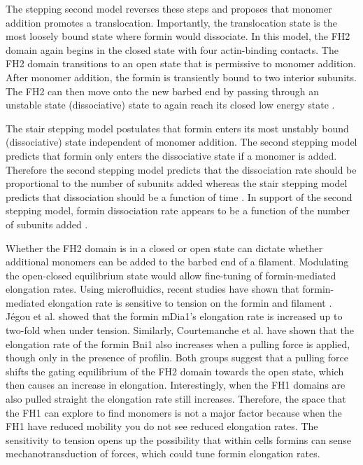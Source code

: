 The stepping second model reverses these steps and proposes that monomer addition promotes a translocation. Importantly, the translocation state is the most loosely bound state where formin would dissociate. In this model, the FH2 domain again begins in the closed state with four actin-binding contacts. The FH2 domain transitions to an open state that is permissive to monomer addition. After monomer addition, the formin is transiently bound to two interior subunits. The FH2 can then move onto the new barbed end by passing through an unstable state (dissociative) state to again reach its closed low energy state \citep{paul_role_2008}.

The stair stepping model postulates that formin enters its most unstably bound (dissociative) state independent of monomer addition. The second stepping model predicts that formin only enters the dissociative state if a monomer is added. Therefore the second stepping model predicts that the dissociation rate should be proportional to the number of subunits added whereas the stair stepping model predicts that dissociation should be a function of time \citep{paul_review_2009}. In support of the second stepping model, formin dissociation rate appears to be a function of the number of subunits added \citep{paul_role_2008}. 

Whether the FH2 domain is in a closed or open state can dictate whether additional monomers can be added to the barbed end of a filament. Modulating the open-closed equilibrium state would allow fine-tuning of formin-mediated elongation rates. Using microfluidics, recent studies have shown that formin-mediated elongation rate is sensitive to tension on the formin and filament \citep{courtemanche_tension_2013,jegou_formin_2013}. Jégou et al. showed that the formin mDia1's elongation rate is increased up to two-fold when under tension. Similarly, Courtemanche et al. have shown that the elongation rate of the formin Bni1 also increases when a pulling force is applied, though only in the presence of profilin. Both groups suggest that a pulling force shifts the gating equilibrium of the FH2 domain towards the open state, which then causes an increase in elongation. Interestingly, when the FH1 domains are also pulled straight the elongation rate still increases. Therefore, the space that the FH1 can explore to find monomers is not a major factor because when the FH1 have reduced mobility you do not see reduced elongation rates.  The sensitivity to tension opens up the possibility that within cells formins can sense mechanotransduction of forces, which could tune formin elongation rates.

